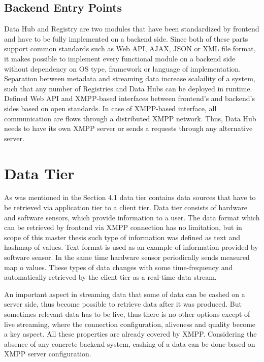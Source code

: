 \subsection{Backend Entry Points}
    Data Hub and Registry are two modules that have been standardized by frontend and have to be fully implemented on a backend side. Since both of these parts support common standards such as Web API, AJAX, JSON or XML file format, it makes possible to implement every functional module on a backend side without dependency on OS type, framework or language of implementation. Separation between metadata and streaming data increase scalaility of a system, such that any number of Registries and Data Hubs can be deployed in runtime. Defined Web API and XMPP-based interfaces between frontend's and backend's sides based on open standards. In case of XMPP-based interface, all communication are flows through a distributed XMPP network. Thus, Data Hub needs to have its own XMPP server or sends a requests through any alternative server.

\section{Data Tier}
   As was mentioned in the Section 4.1 data tier contains data sources that have to be retrieved via application tier to a client tier. Data tier consists of hardware and software sensors, which provide information to a user. The data format which can be retrieved by frontend via XMPP connection has no limitation, but in scope of this master thesis such type of information was defined as text and hashmap of values. Text format is used as an example of information provided by software sensor. In the same time hardware sensor periodically sends measured map o values. These types of data changes with some time-frequency and automatically retrieved by the client tier as a real-time data stream.

  An important aspect in streaming data that some of data can be cashed on a server side, thus become possible to retrieve data after it was produced. But sometimes relevant data has to be live, thus there is no other options except of live streaming, where the connection configuration, aliveness and quality become a key aspect. All these properties are already covered by XMPP. Considering the absence of any concrete backend system, cashing of a data can be done based on XMPP server configuration. 

